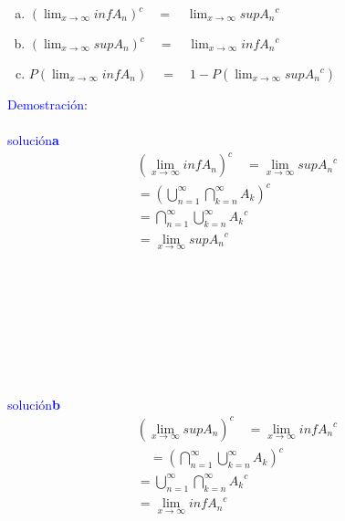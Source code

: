 \documentclass[a4paper, 12pt]{article}
\begin{document}
\begin{enumerate}
\begin{enumerate}[a.]
\item $\left(\displaystyle\lim_{x \rightarrow \infty} inf A_n\right)^c \quad = \quad \displaystyle\lim_{x \rightarrow \infty} sup {A_n}^c $
\item $\left(\displaystyle\lim_{x \rightarrow \infty} sup A_n\right)^c \quad = \quad \displaystyle\lim_{x \rightarrow \infty} inf {A_n}^c $
\item $P\left(\displaystyle\lim_{x \rightarrow \infty} inf A_n\right) \quad = \quad 1 - P\left(\displaystyle\lim_{x \rightarrow \infty} sup {A_n}^c\right)$
\end{enumerate}
\textcolor{blue}{ Demostraci\'on}:\\\\
\textcolor{blue}{ soluci\'on\quad\textbf{a}}\\
\begin{equation*}
\begin{aligned}
\left(\displaystyle\lim_{x \rightarrow \infty} inf A_n\right)^c\quad=\displaystyle\lim_{x \rightarrow \infty} sup {A_n}^c\\
=\left(\displaystyle\bigcup_{n=1}^{\infty}\bigcap_{k=n}^{\infty}{A_k}\right)^c\\
=\displaystyle\bigcap_{n=1}^{\infty}\bigcup_{k=n}^{\infty}{A_k}^c\\
=\displaystyle\lim_{x \rightarrow \infty} sup {A_n}^c
\end{aligned}
\end{equation*}\\\\
\\\\\\\\\\\\
\textcolor{blue}{ soluci\'on\quad\textbf{b}}\\
\begin{equation*}
\begin{aligned}
\left(\displaystyle\lim_{x \rightarrow \infty}sup A_n\right)^c\quad=\displaystyle\lim_{x \rightarrow \infty}inf {A_n}^c\\
\quad=\left(\displaystyle\bigcap_{n=1}^{\infty}\bigcup_{k=n}^{\infty}{A_k}\right)^c\\
=\displaystyle\bigcup_{n=1}^{\infty}\bigcap_{k=n}^{\infty}{A_k}^c\\
=\displaystyle\lim_{x \rightarrow \infty}inf {A_n}^c
\end{aligned}
\end{equation*}\\\\

\end{enumerate}
\end{document}
